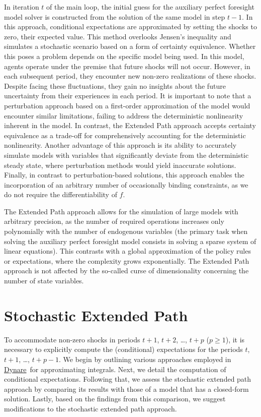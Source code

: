\documentclass[a4paper,11pt]{amsart}
\newcommand{\Dynare}{\href{http://www.dynare.org}{Dynare}}
\begin{document}
In iteration \(t\) of the main loop, the initial guess for the
auxiliary perfect foresight model solver is constructed from the
solution of the same model in step \(t-1\). In this approach,
conditional expectations are approximated by setting the shocks to
zero, their expected value. This method overlooks Jensen's inequality
and simulates a stochastic scenario based on a form of certainty
equivalence. Whether this poses a problem depends on the specific
model being used. In this model, agents operate under the premise that
future shocks will not occur. However, in each subsequent period, they
encounter new non-zero realizations of these shocks. Despite facing
these fluctuations, they gain no insights about the future uncertainty
from their experiences in each period. It is important to note that a
perturbation approach based on a first-order approximation of the
model would encounter similar limitations, failing to address the
deterministic nonlinearity inherent in the model. In contrast, the
Extended Path approach accepts certainty equivalence as a trade-off
for comprehensively accounting for the deterministic
nonlinearity. Another advantage of this approach is its ability to
accurately simulate models with variables that significantly deviate
from the deterministic steady state, where perturbation methods would
yield inaccurate solutions. Finally, in contrast to perturbation-based
solutions, this approach enables the incorporation of an arbitrary
number of occasionally binding constraints, as we do not require the
differentiability of \(f\).\newline

The Extended Path approach allows for the simulation of large models
with arbitrary precision, as the number of required operations
increases only polynomially with the number of endogenous variables
(the primary task when solving the auxiliary perfect foresight model
consists in solving a sparse system of linear equations). This
contrasts with a global approximation of the policy rules or
expectations, where the complexity grows exponentially. The Extended
Path approach is not affected by the so-called curse of dimensionality
concerning the number of state variables.\newline

\section{Stochastic Extended Path}\label{sec:2}

To accommodate non-zero shocks in periods $t+1$, $t+2$, \dots, $t+p$
($p \geq 1$), it is necessary to explicitly compute the (conditional)
expectations for the periods $t$, $t+1$, \dots, $t+p-1$. We begin by
outlining various approaches employed in \Dynare\ for approximating
integrals. Next, we detail the computation of conditional
expectations. Following that, we assess the stochastic extended path
approach by comparing its results with those of a model that has a
closed-form solution. Lastly, based on the findings from this
comparison, we suggest modifications to the stochastic extended path
approach.\newline
\end{document}
